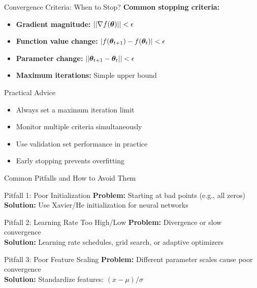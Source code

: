 \documentclass[usenames,dvipsnames]{beamer}
\begin{document}
  \begin{frame}{Convergence Criteria: When to Stop?}
    \textbf{Common stopping criteria:}
    
    \begin{itemize}[<+->]
        \item \textbf{Gradient magnitude:} $||\nabla f(\boldsymbol{\theta})|| < \epsilon$
        \item \textbf{Function value change:} $|f(\boldsymbol{\theta}_{t+1}) - f(\boldsymbol{\theta}_t)| < \epsilon$
        \item \textbf{Parameter change:} $||\boldsymbol{\theta}_{t+1} - \boldsymbol{\theta}_t|| < \epsilon$
        \item \textbf{Maximum iterations:} Simple upper bound
    \end{itemize}
    
    \pause
    \begin{examplebox}{Practical Advice}
    \begin{itemize}
        \item Always set a maximum iteration limit
        \item Monitor multiple criteria simultaneously  
        \item Use validation set performance in practice
        \item Early stopping prevents overfitting
    \end{itemize}
    \end{examplebox}
  \end{frame}

  \begin{frame}{Common Pitfalls and How to Avoid Them}
    \begin{alertbox}{Pitfall 1: Poor Initialization}
    \textbf{Problem:} Starting at bad points (e.g., all zeros)
    \\\textbf{Solution:} Use Xavier/He initialization for neural networks
    \end{alertbox}
    
    \pause
    \begin{alertbox}{Pitfall 2: Learning Rate Too High/Low}
    \textbf{Problem:} Divergence or slow convergence
    \\\textbf{Solution:} Learning rate schedules, grid search, or adaptive optimizers
    \end{alertbox}
    
    \pause
    \begin{alertbox}{Pitfall 3: Poor Feature Scaling}
    \textbf{Problem:} Different parameter scales cause poor convergence
    \\\textbf{Solution:} Standardize features: $(x - \mu)/\sigma$
    \end{alertbox}
  \end{frame}
\end{document}

